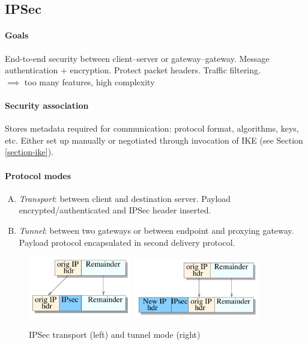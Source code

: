 \newpage
\subsection{IPSec}

\paragraph{Goals} End-to-end security between client--server or gateway--gateway. Message authentication + encryption. Protect packet headers. Traffic filtering. \\
$\implies$ too many features, high complexity

\paragraph{Security association} Stores metadata required for communication: protocol format, algorithms, keys, etc. Either set up manually or negotiated through invocation of IKE (see Section \ref{section-ike}).

\paragraph{Protocol modes}
\begin{enumerate}[A.]
    \item \emph{Transport}: between client and destination server. Payload encrypted/authenticated and IPSec header inserted.
    \item \emph{Tunnel}: between two gateways or between endpoint and proxying gateway. Payload protocol encapsulated in second delivery protocol. 
\end{enumerate}

\begin{figure}[h]
    \centering
    \includegraphics[width=4.5cm]{images/ch9-ipsec-transport.png}
    \hspace{2cm}
    \includegraphics[width=5.5cm]{images/ch9-ipsec-tunnel.png}
    \caption{IPSec transport (left) and tunnel mode (right)}
    \label{fig:ipsec-modes}
\end{figure}

